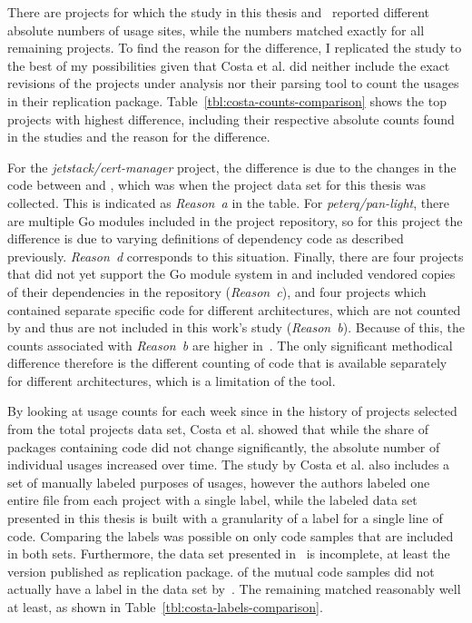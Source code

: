 There are  projects for which the study in this thesis and~\cite{costa2020} reported different absolute
numbers of \unsafe{} usage sites, while the numbers matched exactly for all remaining projects.
To find the reason for the difference, I replicated the study to the best of my possibilities given that Costa et al.
did neither include the exact revisions of the projects under analysis nor their parsing tool to count the \unsafe{}
usages in their replication package.
Table~\ref{tbl:costa-counts-comparison} shows the top  projects with highest difference, including their
respective absolute counts found in the studies and the reason for the difference.



For the \textit{jetstack/cert-manager} project, the difference is due to the changes in the code between
 and , which was when the project data set for this thesis was collected.
This is indicated as \textit{Reason~a} in the table.
For \textit{peterq/pan-light}, there are multiple Go modules included in the project repository, so for this project
the difference is due to varying definitions of dependency code as described previously.
\textit{Reason~d} corresponds to this situation.
Finally, there are four projects that did not yet support the Go module system in  and included
vendored copies of their dependencies in the repository (\textit{Reason~c}), and four projects which contained separate
specific code for different architectures, which are not counted by \toolGeiger{} and thus are not included in this
work's study (\textit{Reason~b}).
Because of this, the counts associated with \textit{Reason~b} are higher in~\cite{costa2020}.
The only significant methodical difference therefore is the different counting of code that is available separately for
different architectures, which is a limitation of the \toolGeiger{} tool.

By looking at \unsafe{} usage counts for each week since  in the history of  projects
selected from the total projects data set, Costa et al. showed that while the share of packages containing \unsafe{}
code did not change significantly, the absolute number of individual \unsafe{} usages increased over time.
The study by Costa et al. also includes a set of manually labeled purposes of \unsafe{} usages, however the authors
labeled one entire file from each project with a single label, while the labeled data set presented in this thesis is
built with a granularity of a label for a single line of code.
Comparing the labels was possible on only  code samples that are included in both sets.
Furthermore, the data set presented in~\cite{costa2020} is incomplete, at least the version published as replication
package.
 of the  mutual code samples did not actually have a label in the data set
by~\cite{costa2020}.
The remaining  matched reasonably well at least, as shown in Table~\ref{tbl:costa-labels-comparison}.


